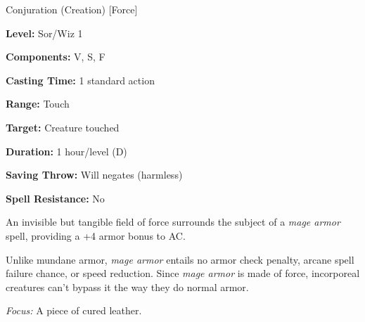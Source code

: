 
Conjuration (Creation) [Force]

\textbf{Level:} Sor/Wiz 1

\textbf{Components:} V, S, F

\textbf{Casting Time:} 1 standard action

\textbf{Range:} Touch

\textbf{Target:} Creature touched

\textbf{Duration:} 1 hour/level (D)

\textbf{Saving Throw:} Will negates (harmless)

\textbf{Spell Resistance:} No

An invisible but tangible field of force surrounds the subject of a \textit{mage 
armor} spell, providing a +4 armor bonus to AC.

Unlike mundane armor, \textit{mage armor} entails no armor check penalty, arcane 
spell failure chance, or speed reduction. Since \textit{mage armor} is made of 
force, incorporeal creatures can't bypass it the way they do normal armor.

\textit{Focus:} A piece of cured leather.

